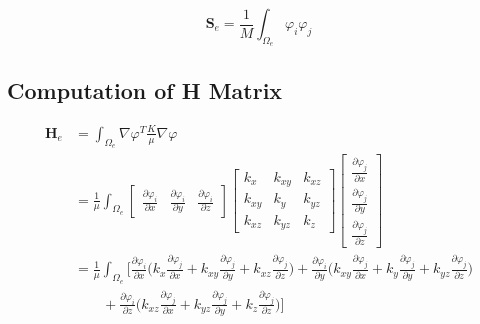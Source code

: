 \documentclass[12pt]{article}
\begin{document}
\begin{equation}
\mathbf{S}_e=\frac{1}{M}\int_{\Omega_e}\varphi_i\varphi_j
\end{equation}
\subsection{Computation of H Matrix}

\begin{equation}
\begin{split}
\mathbf{H}_e&=\int_{\Omega_e}\nabla \varphi^T\frac{K}{\mu}\nabla \varphi	\\
%
&=\frac{1}{\mu}\int_{\Omega_e}
%
\left[
\begin{array}{ccc}
\frac{\partial \varphi_i}{\partial x} &\frac{\partial \varphi_i}{\partial y}&
\frac{\partial \varphi_i}{\partial z}
\end{array}	
\right]
%
\left[
\begin{array}{ccc}
k_x &k_{xy}&k_{xz}	\\
k_{xy}&k_y&k_{yz}	\\
k_{xz}&k_{yz}&k_z
\end{array}	
\right]
%
\left[
\begin{array}{c}
\frac{\partial \varphi_j}{\partial x} 	\\
\frac{\partial \varphi_j}{\partial y}	\\
\frac{\partial \varphi_j}{\partial z}
\end{array}	
\right]	\\
&=
\frac{1}{\mu}\int_{\Omega_e}\Bigg[\frac{\partial \varphi_i}{\partial x}\Big(k_x\frac{\partial \varphi_j}{\partial x}+k_{xy}\frac{\partial \varphi_j}{\partial y}+k_{xz}\frac{\partial \varphi_j}{\partial z}\Big)+
%
\frac{\partial \varphi_i}{\partial y}\Big(k_{xy}\frac{\partial \varphi_j}{\partial x}+k_{y}\frac{\partial \varphi_j}{\partial y}+k_{yz}\frac{\partial \varphi_j}{\partial z}\Big)	\\
%
& \qquad +\frac{\partial \varphi_i}{\partial z}\Big(k_{xz}\frac{\partial \varphi_j}{\partial x}+k_{yz}\frac{\partial \varphi_j}{\partial y}+k_{z}\frac{\partial \varphi_j}{\partial z}\Big)
\Bigg]
\end{split}
\end{equation}
%
\end{document}
